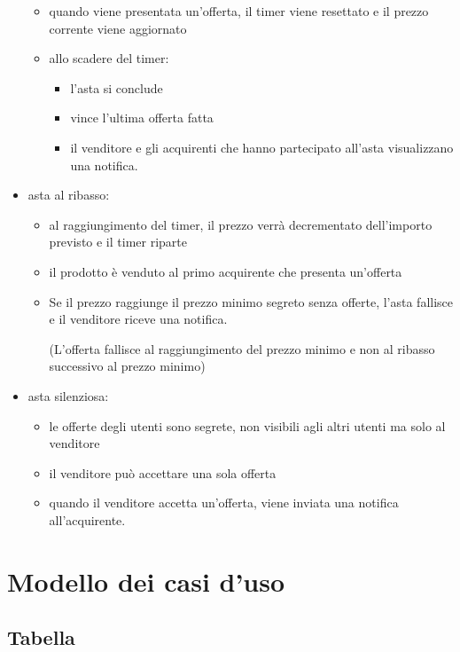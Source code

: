 \begin{itemize}
\begin{itemize}[label={\tiny$\blacksquare$}]
		      \item quando viene presentata un'offerta, il timer viene resettato e il prezzo corrente viene aggiornato
		      \item allo scadere del timer:
		            \begin{itemize}[label={\tiny$-$}]
			            \item l'asta si conclude
			            \item vince l'ultima offerta fatta
			            \item il venditore e gli acquirenti che hanno partecipato all'asta visualizzano una notifica.
		            \end{itemize}
	      \end{itemize}
	\item asta al ribasso:
	      \begin{itemize}[label={\tiny$\blacksquare$}]
		      \item al raggiungimento del timer, il prezzo verrà decrementato dell'importo previsto e il timer riparte
		      \item il prodotto è venduto al primo acquirente che presenta un'offerta
		      \item Se il prezzo raggiunge il prezzo minimo segreto senza offerte, l'asta fallisce e il venditore riceve una notifica.

			            {\small (L'offerta fallisce al raggiungimento del prezzo minimo e non al ribasso successivo al prezzo minimo)}
	      \end{itemize}
	\item asta silenziosa:
	      \begin{itemize}[label={\tiny$\blacksquare$}]
		      \item le offerte degli utenti sono segrete, non visibili agli altri utenti ma solo al venditore
		      \item il venditore può accettare una sola offerta
		      \item quando il venditore accetta un'offerta, viene inviata una notifica all'acquirente.
	      \end{itemize}

\end{itemize}

\newpage

\section{Modello dei casi d'uso}
\subsection{Tabella}

